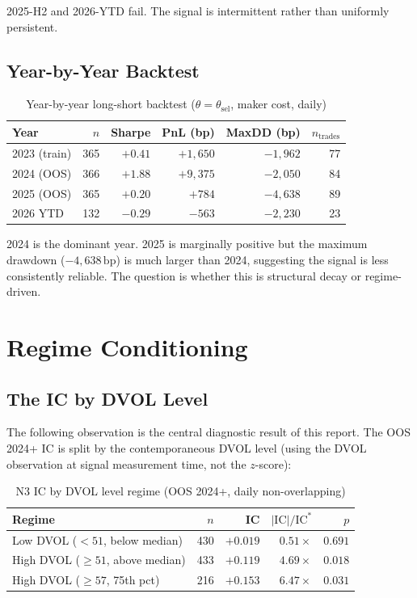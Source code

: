 \documentclass[12pt, a4paper]{article}
\theoremstyle{plain}
\theoremstyle{definition}
\newcommand{\IC}{\mathrm{IC}}
\newcommand{\bp}{\,\mathrm{bp}}
\begin{document}
2025-H2 and 2026-YTD fail. The signal is intermittent rather than uniformly
persistent.

\subsection{Year-by-Year Backtest}

\begin{table}[H]
\centering
\caption{Year-by-year long-short backtest ($\theta = \theta_\mathrm{sel}$, maker cost, daily)}
\label{tab:yearly}
\begin{tabular}{lrrrrr}
\toprule
Year & $n$ & Sharpe & PnL (bp) & MaxDD (bp) & $n_{\text{trades}}$ \\
\midrule
2023 (train) & 365 & $+0.41$ & $+1{,}650$ & $-1{,}962$ & 77 \\
2024 (OOS)   & 366 & $+1.88$ & $+9{,}375$ & $-2{,}050$ & 84 \\
2025 (OOS)   & 365 & $+0.20$ & $+784$     & $-4{,}638$ & 89 \\
2026 YTD     & 132 & $-0.29$ & $-563$     & $-2{,}230$ & 23 \\
\bottomrule
\end{tabular}
\end{table}

2024 is the dominant year. 2025 is marginally positive but the maximum
drawdown ($-4{,}638\bp$) is much larger than 2024, suggesting the signal
is less consistently reliable. The question is whether this is structural
decay or regime-driven.


\section{Regime Conditioning}
\label{sec:regime}

\subsection{The IC by DVOL Level}

The following observation is the central diagnostic result of this report.
The OOS 2024+ IC is split by the contemporaneous DVOL level (using the
DVOL observation at signal measurement time, not the $z$-score):

\begin{table}[H]
\centering
\caption{N3 IC by DVOL level regime (OOS 2024+, daily non-overlapping)}
\label{tab:n3_regime}
\begin{tabular}{lrrrr}
\toprule
Regime & $n$ & IC & $|\IC|/\IC^*$ & $p$ \\
\midrule
Low DVOL ($< 51$, below median)   & 430 & $+0.019$ & $0.51\times$ & $0.691$ \\
High DVOL ($\geq 51$, above median) & 433 & $+0.119$ & $4.69\times$ & $0.018$ \\
High DVOL ($\geq 57$, 75th pct) & 216 & $+0.153$ & $6.47\times$ & $0.031$ \\
\bottomrule
\end{tabular}
\end{table}
\end{document}
